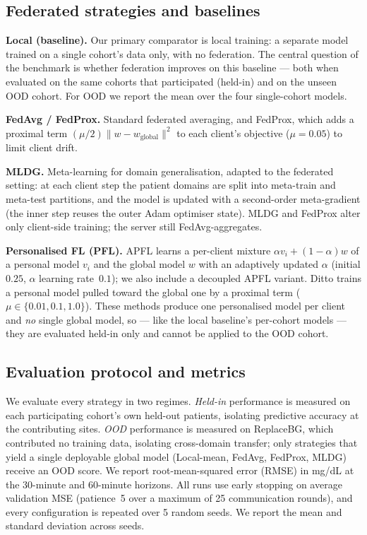 \documentclass[10pt,letterpaper]{article}
\begin{document}
\subsection*{Federated strategies and baselines}

\textbf{Local (baseline).} Our primary comparator is local training: a separate
model trained on a single cohort's data only, with no federation. The central
question of the benchmark is whether federation improves on this baseline ---
both when evaluated on the same cohorts that participated (held-in) and on the
unseen OOD cohort. For OOD we report the mean over the four single-cohort models.

\textbf{FedAvg / FedProx.} Standard federated averaging, and FedProx, which adds
a proximal term $(\mu/2)\lVert w - w_{\text{global}}\rVert^2$ to each client's
objective ($\mu=0.05$) to limit client drift.

\textbf{MLDG.} Meta-learning for domain generalisation, adapted to the federated
setting: at each client step the patient domains are split into meta-train and
meta-test partitions, and the model is updated with a second-order meta-gradient
(the inner step reuses the outer Adam optimiser state). MLDG and FedProx alter
only client-side training; the server still FedAvg-aggregates.

\textbf{Personalised FL (PFL).} APFL learns a per-client mixture
$\alpha v_i + (1-\alpha)w$ of a personal model $v_i$ and the global model $w$
with an adaptively updated $\alpha$ (initial $0.25$, $\alpha$ learning
rate~$0.1$); we also include a decoupled APFL variant. Ditto trains a personal
model pulled toward the global one by a proximal term ($\mu\in\{0.01,0.1,1.0\}$).
These methods produce one personalised model per client and \emph{no} single
global model, so --- like the local baseline's per-cohort models --- they are
evaluated held-in only and cannot be applied to the OOD cohort.

\subsection*{Evaluation protocol and metrics}

We evaluate every strategy in two regimes. \emph{Held-in} performance is measured
on each participating cohort's own held-out patients, isolating predictive
accuracy at the contributing sites. \emph{OOD} performance is measured on
ReplaceBG, which contributed no training data, isolating cross-domain transfer;
only strategies that yield a single deployable global model (Local-mean, FedAvg,
FedProx, MLDG) receive an OOD score. We report root-mean-squared error (RMSE) in
mg/dL at the 30-minute and 60-minute horizons. All runs use early stopping on
average validation MSE (patience~5 over a maximum of 25 communication rounds),
and every configuration is repeated over 5 random seeds. We
report the mean and standard deviation across seeds.
\end{document}
